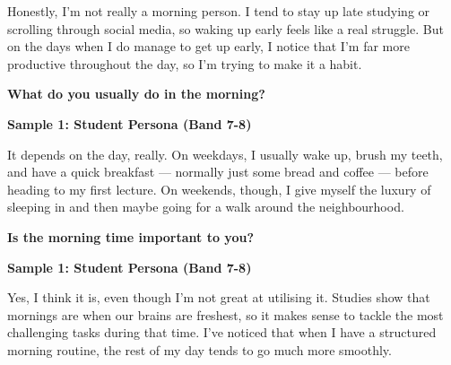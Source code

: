 Honestly, I'm not really a morning person. I tend to stay up late studying or scrolling through social media, so waking up early feels like a real struggle. But on the days when I do manage to get up early, I notice that I'm far more productive throughout the day, so I'm trying to make it a habit.

\separator

\begin{ieltsquestion}
\textbf{What do you usually do in the morning?}
\end{ieltsquestion}
\textbf{Sample 1: Student Persona (Band 7-8)}

It depends on the day, really. On weekdays, I usually wake up, brush my teeth, and have a quick breakfast — normally just some bread and coffee — before heading to my first lecture. On weekends, though, I give myself the luxury of sleeping in and then maybe going for a walk around the neighbourhood.

\separator

\begin{ieltsquestion}
\textbf{Is the morning time important to you?}
\end{ieltsquestion}
\textbf{Sample 1: Student Persona (Band 7-8)}

Yes, I think it is, even though I'm not great at utilising it. Studies show that mornings are when our brains are freshest, so it makes sense to tackle the most challenging tasks during that time. I've noticed that when I have a structured morning routine, the rest of my day tends to go much more smoothly.

\separator


